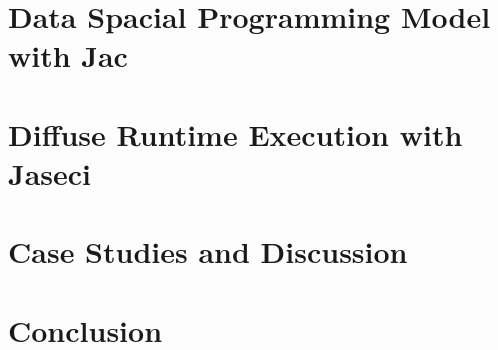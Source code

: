 \documentclass[9pt,journal,compsoc]{IEEEtran}
\begin{document}
\section{Data Spacial Programming Model with Jac}\label{sec:jac}



\section{Diffuse Runtime Execution with Jaseci}\label{sec:arch}



\section{Case Studies and Discussion}\label{sec:casestudy}


\balance
\section{Conclusion}


\ifCLASSOPTIONcaptionsoff
    \newpage
\fi




\end{document}
